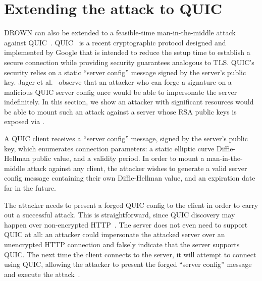 

\section{Extending the attack to QUIC}
\label{sec:quic}

DROWN can also be extended to a feasible-time man-in-the-middle attack
against QUIC~\cite{tls-quic-pkcs-2015}. QUIC~\cite{quic,
quic-langley-2014} is a recent cryptographic protocol designed and implemented
by Google that is intended to reduce the setup time to establish a secure
connection while providing security guarantees analogous to TLS\@. QUIC's
security relies on a static ``server config'' message signed by the server's
public key. Jager et al.\@~\cite{tls-quic-pkcs-2015} observe that
an attacker who can forge a signature on a malicious QUIC server config once
would be able to impersonate the server indefinitely. In this section, we
show an attacker with significant resources would be able to mount such an
attack against a server whose RSA public keys is exposed via \ssltwo.

A QUIC client receives a ``server config'' message, signed by the server's public key, which enumerates connection parameters: a static elliptic curve Diffie-Hellman public value, and a validity period.  In order to mount a man-in-the-middle attack against any client, the attacker wishes to generate a valid server config message containing their own Diffie-Hellman value, and an expiration date far in the future.

The attacker needs to present a forged QUIC config to the client in order to carry out a successful attack.  This is straightforward, since QUIC discovery may happen over non-encrypted HTTP~\cite{QUICDiscovery}.  The server does not even need to support QUIC at all: an attacker could impersonate the attacked server over an unencrypted HTTP connection and falsely indicate that the server supports QUIC\@. The next time the client connects to the server, it will attempt to connect using QUIC, allowing the attacker to present the forged ``server config'' message and execute the attack~\cite{tls-quic-pkcs-2015}.

